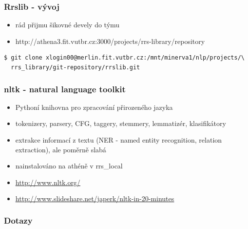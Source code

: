 \documentclass{beamer}
\begin{document}
\begin{frame}[containsverbatim]
  \frametitle{Rrslib - vývoj}
  \begin{itemize}
    \item rád přijmu šikovné devely do týmu
    \item http://athena3.fit.vutbr.cz:3000/projects/rrs-library/repository
  \end{itemize}
  \begingroup
  \fontsize{7pt}{8pt}\selectfont
  \begin{verbatim}
$ git clone xlogin00@merlin.fit.vutbr.cz:/mnt/minerva1/nlp/projects/\
  rrs_library/git-repository/rrslib.git
  \end{verbatim}
  \endgroup
\end{frame}

\begin{frame}
  \frametitle{nltk - natural language toolkit}
  \begin{itemize}
    \item Pythoní knihovna pro zpracování přirozeného jazyka
    \item tokenizery, parsery, CFG, taggery, stemmery, lemmatizér, klasifikátory
    \item extrakce informací z textu (NER - named entity recognition, relation extraction), ale poměrně slabá
    \item nainstalováno na athéně v rrs\_local
    \item \textcolor{blue}{\underline{\href{http://www.nltk.org/}{http://www.nltk.org/}}}
    \item \textcolor{blue}{\underline{\href{http://www.slideshare.net/japerk/nltk-in-20-minutes}{http://www.slideshare.net/japerk/nltk-in-20-minutes}}}
  \end{itemize}
\end{frame}

\begin{frame}
  \frametitle{Dotazy}
  \fontsize{25pt}{25pt}\selectfont{???}
\end{frame}
\end{document}
